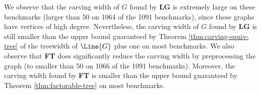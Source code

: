 We observe that the carving width of $G$ found by \textbf{LG} is extremely large on these benchmarks (larger than $50$ on 1064 of the 1091 benchmarks), since these graphs have vertices of high degree. Nevertheless, the carving width of $G$ found by \textbf{LG} is still smaller than the upper bound guaranteed by Theorem \ref{thm:carving-equiv-tree} of the treewidth of $\Line{G}$ plus one on most benchmarks. We also observe that \textbf{FT} does significantly reduce the carving width by preprocessing the graph (to smaller than 50 on 1066 of the 1091 benchmarks).  Moreover, the carving width found by \textbf{FT} is smaller than the upper bound guaranteed by Theorem \ref{thm:factorable-tree} on most benchmarks.

%
%	
